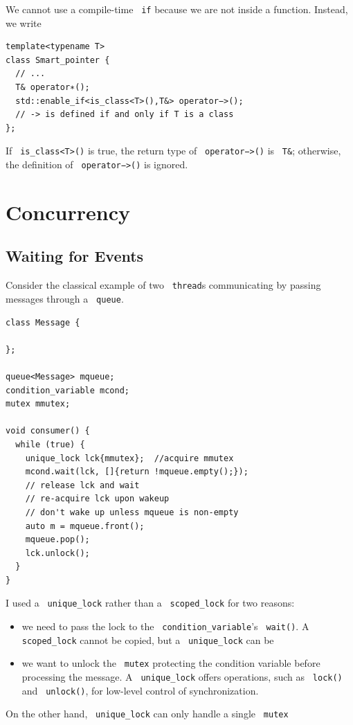 \documentclass[11pt]{article}
\let\OldTexttt\texttt
\renewcommand{\texttt}[1]{\OldTexttt{\color{MidnightBlue} #1}}
\begin{document}
We cannot use a compile-time \texttt{if} because we are not inside a function. Instead, we write
\begin{verbatim}
template<typename T>
class Smart_pointer {
  // ...
  T& operator∗();
  std::enable_if<is_class<T>(),T&> operator−>();
  // -> is defined if and only if T is a class
};
\end{verbatim}

If \texttt{is\_class<T>()} is true, the return type of \texttt{operator−>()} is \texttt{T\&}; otherwise, the definition of
\texttt{operator−>()} is ignored.
\section{Concurrency}
\label{sec:org18e7860}
\subsection{Waiting for Events}
\label{sec:orgc13f834}
Consider the classical example of two \texttt{thread}​s communicating by passing messages through a \texttt{queue}.
\begin{verbatim}
class Message {

};

queue<Message> mqueue;
condition_variable mcond;
mutex mmutex;

void consumer() {
  while (true) {
    unique_lock lck{mmutex};  //acquire mmutex
    mcond.wait(lck, []{return !mqueue.empty();});
    // release lck and wait
    // re-acquire lck upon wakeup
    // don't wake up unless mqueue is non-empty
    auto m = mqueue.front();
    mqueue.pop();
    lck.unlock();
  }
}
\end{verbatim}

I used a \texttt{unique\_lock} rather than a \texttt{scoped\_lock} for two reasons:
\begin{itemize}
\item we need to pass the lock to the \texttt{condition\_variable}'s \texttt{wait()}. A \texttt{scoped\_lock} cannot be copied,
but a \texttt{unique\_lock} can be
\item we want to unlock the \texttt{mutex} protecting the condition variable before processing the message. A
\texttt{unique\_lock} offers operations, such as \texttt{lock()} and \texttt{unlock()}, for low-level control of
synchronization.
\end{itemize}

On the other hand, \texttt{unique\_lock} can only handle a single \texttt{mutex}
\end{document}
